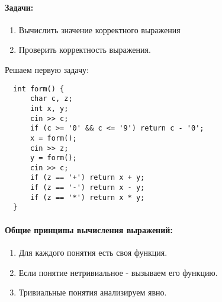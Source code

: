 \documentclass{article}
\begin{document}
\paragraph{Задачи:}

\begin{enumerate}
\item
  Вычислить значение корректного выражения
\item
  Проверить корректность выражения.
\end{enumerate}

\newpage
Решаем первую задачу:

\begin{lstlisting}
  int form() {
      char c, z;
      int x, y;
      cin >> c;
      if (c >= '0' && c <= '9') return c - '0';
      x = form();
      cin >> z;
      y = form();
      cin >> c;
      if (z == '+') return x + y;
      if (z == '-') return x - y;
      if (z == '*') return x * y;
  }
\end{lstlisting}

\paragraph{Общие принципы вычисления выражений:}

\begin{enumerate}
\item
  Для каждого понятия есть своя функция.
\item
  Если понятие нетривиальное - вызываем его функцию.
\item
  Тривиальные понятия анализируем явно.
\end{enumerate}
\end{document}
